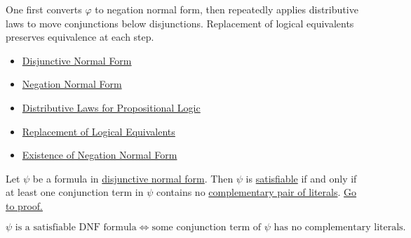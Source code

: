 \begin{remark*}[Interpretation]
One first converts \(\varphi\) to negation normal form, then repeatedly applies
distributive laws to move conjunctions below disjunctions. Replacement of
logical equivalents preserves equivalence at each step.
\end{remark*}

\begin{dependencies}
\begin{itemize}
  \item \hyperref[def:disjunctive-normal-form-propositional-logic]{Disjunctive Normal Form}
  \item \hyperref[def:negation-normal-form-propositional-logic]{Negation Normal Form}
  \item \hyperref[thm:distributive-laws-propositional-logic]{Distributive Laws for Propositional Logic}
  \item \hyperref[thm:replacement-of-logical-equivalents-propositional-logic]{Replacement of Logical Equivalents}
  \item \hyperref[thm:existence-negation-normal-form-propositional-logic]{Existence of Negation Normal Form}
\end{itemize}
\end{dependencies}

\begin{tcolorbox}[colback=thmbox, colframe=thmborder, arc=2pt, left=6pt, right=6pt, top=4pt, bottom=4pt, title={\small\textbf{Theorem (DNF Satisfiability Criterion)}}]
\begin{theorem}
\label{thm:dnf-satisfiability-criterion-propositional-logic}
Let \(\psi\) be a formula in
\hyperref[def:disjunctive-normal-form-propositional-logic]{disjunctive normal form}.
Then \(\psi\) is
\hyperref[def:satisfiable-formula-propositional-logic]{satisfiable} if and only
if at least one conjunction term in \(\psi\) contains no
\hyperref[def:complementary-literals-propositional-logic]{complementary pair of literals}.
\noindent\hyperref[prf:dnf-satisfiability-criterion-propositional-logic]{Go to proof.}
\end{theorem}
\end{tcolorbox}

\begin{remark*}
\[
\psi\text{ is a satisfiable DNF formula}
\Longleftrightarrow
\text{some conjunction term of }\psi\text{ has no complementary literals.}
\]
\end{remark*}

